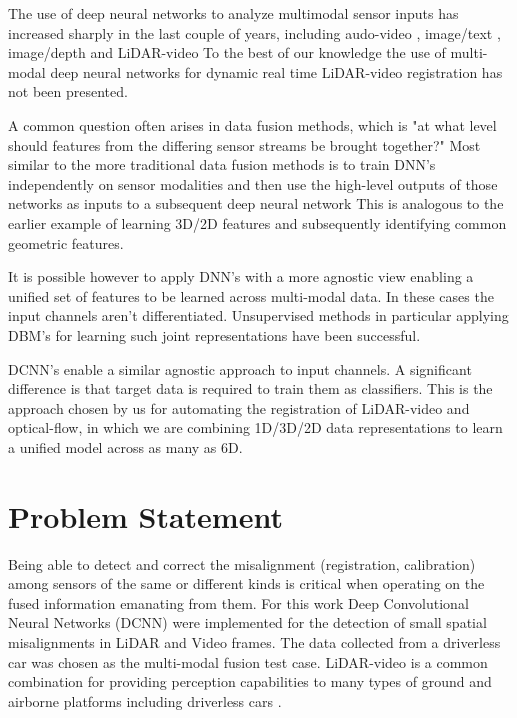 \documentclass{article}
\begin{document}

The use of deep neural networks to analyze multimodal sensor inputs  has increased sharply in the last couple of years, including audo-video \cite{Ngiam2011Multimodal} \cite{Kim2013Deep-Learn}, image/text \cite{Srivastava2012Multimodal}, image/depth \cite{Lenz2013Deep-Learn} and LiDAR-video To the best of our knowledge the use of multi-modal deep neural networks for dynamic real time LiDAR-video registration has not been presented.

A common question often arises in data fusion methods, which is "at what level should features from the differing sensor streams be brought together?" Most similar to the more traditional data fusion methods is to train DNN's independently on sensor modalities and then use the high-level outputs of those networks as inputs to a subsequent deep neural network This is analogous to the earlier example of learning 3D/2D features and subsequently identifying common geometric features. 

It is possible however to apply DNN's with a more agnostic view enabling a unified set of features to be learned across multi-modal data. In these cases the input channels aren't differentiated. Unsupervised methods in particular applying DBM's for learning such joint representations have been successful.  

DCNN's enable a similar agnostic approach to input channels. A significant difference is that target data is required to train them as classifiers. This is the approach chosen by us for automating the registration of LiDAR-video and optical-flow, in which we are combining 1D/3D/2D data representations to learn a unified model across as many as 6D. 




\section{Problem Statement} %
\label{sec:problem_statement}

Being able to detect and correct the misalignment (registration, calibration) among sensors of the same or different kinds is critical when operating on the fused information emanating from them. For this work Deep Convolutional Neural Networks (DCNN) were implemented for the detection of small spatial misalignments in LiDAR and Video frames. The data collected from a driverless car was chosen as the multi-modal fusion test case. LiDAR-video is a common combination for providing perception capabilities to many types of ground and airborne platforms including driverless cars \cite{Thrun2011Googles-dr}. 
\end{document}
